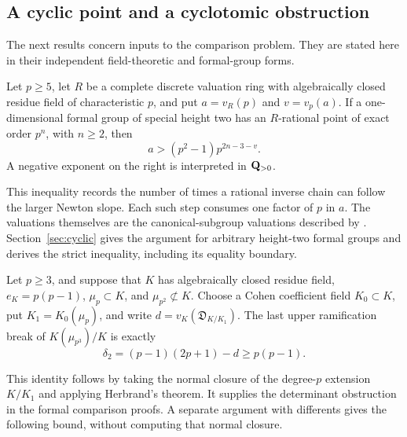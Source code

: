


\subsection{A cyclic point and a cyclotomic obstruction}
The next results concern inputs to the comparison problem. They are stated here in their independent field-theoretic and formal-group forms.

\begin{theorem}\label{thm:cyclic-bound}
Let $p\ge5$, let $R$ be a complete discrete valuation ring with algebraically closed residue field of characteristic $p$, and put $a=v_R(p)$ and $v=v_p(a)$. If a one-dimensional formal group of special height two has an $R$-rational point of exact order $p^n$, with $n\ge2$, then
\begin{equation}\label{eq:cyclic-bound}
 a>(p^2-1)p^{2n-3-v}.
\end{equation}
A negative exponent on the right is interpreted in $\mathbf Q_{>0}$.
\end{theorem}

This inequality records the number of times a rational inverse chain can follow the larger Newton slope. Each such step consumes one factor of $p$ in $a$. The valuations themselves are the canonical-subgroup valuations described by \citet[Theorem~4.4 and Corollaries~4.5--4.6, pp.~10--11 of the author version]{Smith2023}. Section~\ref{sec:cyclic} gives the argument for arbitrary height-two formal groups and derives the strict inequality, including its equality boundary.

\begin{theorem}\label{thm:cyclotomic-exact}
Let $p\ge3$, and suppose that $K$ has algebraically closed residue field, $e_K=p(p-1)$, $\mu_p\subset K$, and $\mu_{p^2}\not\subset K$. Choose a Cohen coefficient field $K_0\subset K$, put $K_1=K_0(\mu_p)$, and write $d=v_K(\mathfrak D_{K/K_1})$. The last upper ramification break of $K(\mu_{p^3})/K$ is exactly
\begin{equation}\label{eq:exact-second-break}
 \delta_2=(p-1)(2p+1)-d\ge p(p-1).
\end{equation}
\end{theorem}

This identity follows by taking the normal closure of the degree-$p$ extension $K/K_1$ and applying Herbrand's theorem. It supplies the determinant obstruction in the formal comparison proofs. A separate argument with differents gives the following bound, without computing that normal closure.

